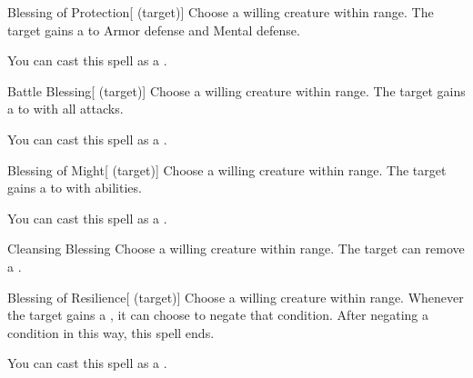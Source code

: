 \lowercase{\hypertarget{spell:Blessing of Protection}{}}\label{spell:Blessing of Protection}
\begin{attuneability}[\nth{1}]{\hypertarget{spell:Blessing of Protection}{Blessing of Protection}}[ (target)]
Choose a willing creature within \rngclose range.
The target gains a   to Armor defense and Mental defense.

You can cast this spell as a .
\end{attuneability}
\vspace{0.25em}



\lowercase{\hypertarget{spell:Battle Blessing}{}}\label{spell:Battle Blessing}
\begin{attuneability}[\nth{2}]{\hypertarget{spell:Battle Blessing}{Battle Blessing}}[ (target)]
Choose a willing creature within \rngclose range.
The target gains a   to  with all attacks.

You can cast this spell as a .
\end{attuneability}
\vspace{0.25em}



\lowercase{\hypertarget{spell:Blessing of Might}{}}\label{spell:Blessing of Might}
\begin{attuneability}[\nth{2}]{\hypertarget{spell:Blessing of Might}{Blessing of Might}}[ (target)]
Choose a willing creature within \rngclose range.
The target gains a   to  with  abilities.

You can cast this spell as a .
\end{attuneability}
\vspace{0.25em}



\lowercase{\hypertarget{spell:Cleansing Blessing}{}}\label{spell:Cleansing Blessing}
\begin{freeability}[\nth{2}]{\hypertarget{spell:Cleansing Blessing}{Cleansing Blessing}}
Choose a willing creature within \rngclose range.
The target can remove a .
\end{freeability}
\vspace{0.25em}



\lowercase{\hypertarget{spell:Blessing of Resilience}{}}\label{spell:Blessing of Resilience}
\begin{attuneability}[\nth{3}]{\hypertarget{spell:Blessing of Resilience}{Blessing of Resilience}}[ (target)]
Choose a willing creature within \rngclose range.
Whenever the target gains a , it can choose to negate that condition.
After negating a condition in this way, this spell ends.

You can cast this spell as a .
\end{attuneability}
\vspace{0.25em}



